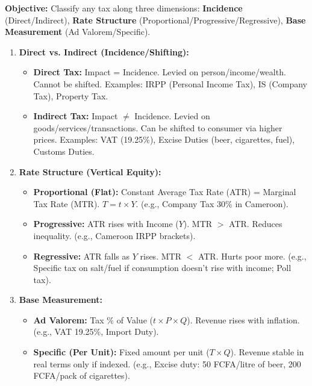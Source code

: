 \documentclass[11pt]{article}
\newcommand{\cle}[1]{{\popxbold\color{popdark}#1}}
\begin{document}
\begin{methode}
\textbf{Objective:} Classify any tax along three dimensions: \textbf{Incidence} (Direct/Indirect), \textbf{Rate Structure} (Proportional/Progressive/Regressive), \textbf{Base Measurement} (Ad Valorem/Specific).
\begin{enumerate}
    \item \textbf{Direct vs. Indirect (Incidence/Shifting):}
    \begin{itemize}
        \item \textbf{Direct Tax:} Impact = Incidence. Levied on person/income/wealth. Cannot be shifted. Examples: \cle{IRPP} (Personal Income Tax), \cle{IS} (Company Tax), Property Tax.
        \item \textbf{Indirect Tax:} Impact $\neq$ Incidence. Levied on goods/services/transactions. Can be shifted to consumer via higher prices. Examples: \cle{VAT} (19.25\%), \cle{Excise Duties} (beer, cigarettes, fuel), \cle{Customs Duties}.
    \end{itemize}
    \item \textbf{Rate Structure (Vertical Equity):}
    \begin{itemize}
        \item \textbf{Proportional (Flat):} Constant Average Tax Rate (ATR) = Marginal Tax Rate (MTR). $T = t \times Y$. (e.g., Company Tax 30\% in Cameroon).
        \item \textbf{Progressive:} ATR rises with Income ($Y$). MTR $>$ ATR. Reduces inequality. (e.g., Cameroon IRPP brackets).
        \item \textbf{Regressive:} ATR falls as $Y$ rises. MTR $<$ ATR. Hurts poor more. (e.g., Specific tax on salt/fuel if consumption doesn't rise with income; Poll tax).
    \end{itemize}
    \item \textbf{Base Measurement:}
    \begin{itemize}
        \item \textbf{Ad Valorem:} Tax $\%$ of Value ($t \times P \times Q$). Revenue rises with inflation. (e.g., VAT 19.25\%, Import Duty).
        \item \textbf{Specific (Per Unit):} Fixed amount per unit ($T \times Q$). Revenue stable in real terms only if indexed. (e.g., Excise duty: 50 FCFA/litre of beer, 200 FCFA/pack of cigarettes).
    \end{itemize}
\end{enumerate}
\end{methode}
\end{document}
